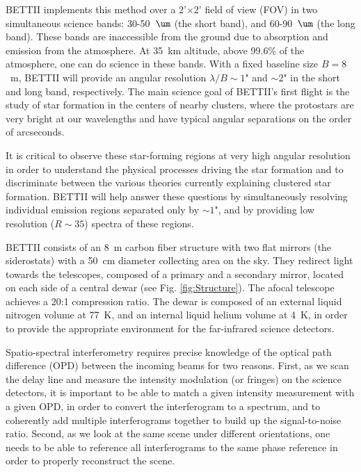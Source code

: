 BETTII implements this method over a 2'$\times$2' field of view (FOV) in two simultaneous science bands: 30-50~$\um$ (the short band), and 60-90~$\um$ (the long band). These bands are inaccessible from the ground due to absorption and emission from the atmosphere. At 35~km altitude, above 99.6\% of the atmosphere, one can do science in these bands. With a fixed baseline size $B=8$~m, BETTII will provide an angular resolution $\lambda/B\sim 1$" and $\sim 2$" in the short and long band, respectively. The main science goal of BETTII's first flight is the study of star formation in the centers of nearby clusters, where the protostars are very bright at our wavelengths and have typical angular separations on the order of arcseconds. 

It is critical to observe these star-forming regions at very high angular resolution in order to understand the physical processes driving the star formation and to discriminate between the various theories currently explaining clustered star formation. BETTII will help answer these questions by simultaneously resolving individual emission regions separated only by $\sim 1$", and by providing low resolution ($R\sim 35$) spectra of these regions.

BETTII consists of an 8~m carbon fiber structure with two flat mirrors (the siderostats) with a 50~cm diameter collecting area on the sky. They redirect light towards the telescopes, composed of a primary and a secondary mirror, located on each side of a central dewar (see Fig. \ref{fig:Structure}). The afocal telescope achieves a 20:1 compression ratio. The dewar is composed of an external liquid nitrogen volume at 77~K, and an internal liquid helium volume at 4~K, in order to provide the appropriate environment for the far-infrared science detectors. %

Spatio-spectral interferometry requires precise knowledge of the optical path difference (OPD) between the incoming beams for two reasons. First, as we scan the delay line and measure the intensity modulation (or fringes) on the science detectors, it is important to be able to match a given intensity measurement with a given OPD, in order to convert the interferogram to a spectrum, and to coherently add multiple interferograms together to build up the signal-to-noise ratio. Second, as we look at the same scene under different orientations, one needs to be able to reference all interferograms to the same phase reference in order to properly reconstruct the scene.

